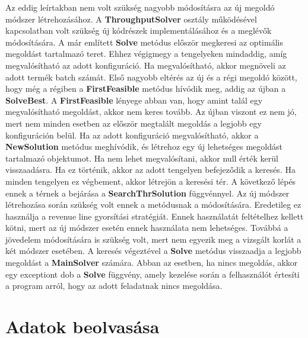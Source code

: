 Az eddig leírtakban nem volt szükség nagyobb módosításra az új megoldó módszer létrehozásához.
A \textbf{ThroughputSolver} osztály működésével kapcsolatban volt szükség új kódrészek implementálásához és a meglévők módosítására.
A már említett \textbf{Solve} metódus először megkeresi az optimális megoldást tartalmazó teret.
Ehhez végigmegy a tengelyeken mindaddig, amíg megvalósítható az adott konfiguráció.
Ha megvalósítható, akkor megnöveli az adott termék batch számát.
Első nagyobb eltérés az új és a régi megoldó között, hogy még a régiben a \textbf{FirstFeasible} metódus hívódik meg, addig az újban a \textbf{SolveBest}.
A \textbf{FirstFeasible} lényege abban van, hogy amint talál egy megvalósítható megoldást, akkor nem keres tovább.
Az újban viszont ez nem jó, mert nem minden esetben az először megtalált megoldás a legjobb egy konfiguráción belül. Ha az adott konfiguráció megvalósítható, akkor a \textbf{NewSolution}
metódus meghívódik, és létrehoz egy új lehetséges megoldást tartalmazó objektumot.
Ha nem lehet megvalósítani, akkor null érték kerül visszaadásra.
Ha ez történik, akkor az adott tengelyen befejeződik a keresés.
Ha minden tengelyen ez végbement, akkor létrejön a keresési tér.
A következő lépés ennek a térnek a bejárása a \textbf{SearchThrSolution} függvénnyel.
Az új módszer létrehozása során szükség volt ennek a metódusnak a módosítására.
Eredetileg ez használja a revenue line gyorsítási stratégiát.
Ennek használatát feltételhez kellett kötni, mert az új módszer esetén ennek használata nem lehetséges.
Továbbá a jövedelem módosítására is szükség volt, mert nem egyezik meg a vizsgált korlát a két módszer esetében.
A keresés végeztével a \textbf{Solve} metódus visszaadja a legjobb megoldást a \textbf{MainSolver} számára.
Abban az esetben, ha nincs megoldás, akkor egy exceptiont dob a \textbf{Solve} függvény, amely kezelése során a felhasználót értesíti a program arról, hogy az adott feladatnak nincs megoldása.

\section{Adatok beolvasása}
